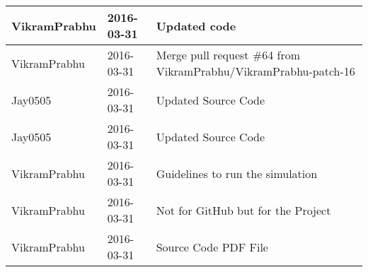 \documentclass[a4paper]{article}
\begin{document}
\begin{center}
\begin{longtable}{|l|l|l|}
VikramPrabhu & 2016-03-31 & Updated code \\ \hline
VikramPrabhu & 2016-03-31 & Merge pull request \#64 from VikramPrabhu/VikramPrabhu-patch-16 \\ \hline
Jay0505 & 2016-03-31 & Updated Source Code \\ \hline
Jay0505 & 2016-03-31 & Updated Source Code \\ \hline
VikramPrabhu & 2016-03-31 & Guidelines to run the simulation \\ \hline
VikramPrabhu & 2016-03-31 & Not for GitHub but for the Project \\ \hline
VikramPrabhu & 2016-03-31 & Source Code PDF File \\ \hline
\end{longtable}
\end{center}
\end{document}
